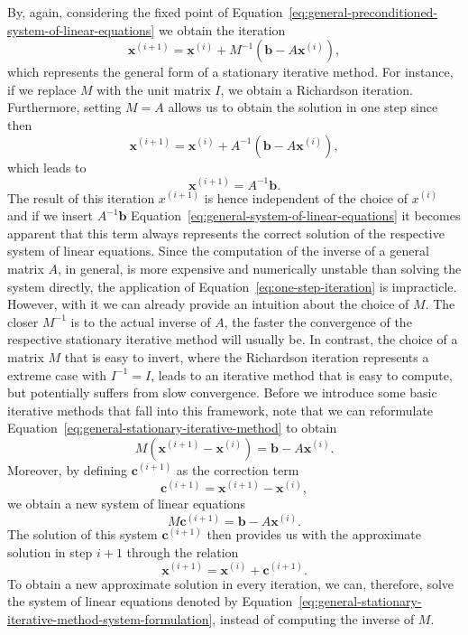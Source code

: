 By, again, considering the fixed point of Equation~\eqref{eq:general-preconditioned-system-of-linear-equations} we obtain the iteration
\begin{equation}
	\bm{x}^{(i+1)} = \bm{x}^{(i)} + M^{-1}(\bm b - A \bm{x}^{(i)}),
	\label{eq:general-stationary-iterative-method}
\end{equation}
which represents the general form of a stationary iterative method. 
For instance, if we replace $M$ with the unit matrix $I$, we obtain a Richardson iteration.
Furthermore, setting $M = A$ allows us to obtain the solution in one step since then
\begin{equation}
	\bm{x}^{(i+1)} = \bm{x}^{(i)} + A^{-1}(\bm b - A \bm{x}^{(i)}),
	\label{eq:one-step-iteration}
\end{equation}
which leads to
\begin{equation}
	\bm{x}^{(i+1)} = A^{-1}\bm b.
\end{equation}
The result of this iteration $x^{(i+1)}$ is hence independent of the choice of $x^{(i)}$ and if we insert $A^{-1}\bm b$ Equation~\eqref{eq:general-system-of-linear-equations} it becomes apparent that this term always represents the correct solution of the respective system of linear equations.
Since the computation of the inverse of a general matrix $A$, in general, is more expensive and numerically unstable than solving the system directly, the application of Equation~\eqref{eq:one-step-iteration} is impracticle.
However, with it we can already provide an intuition about the choice of $M$.
The closer $M^{-1}$ is to the actual inverse of $A$, the faster the convergence of the respective stationary iterative method will usually be.
In contrast, the choice of a matrix $M$ that is easy to invert, where the Richardson iteration represents a extreme case with $I^{-1} = I$, leads to an iterative method that is easy to compute, but potentially suffers from slow convergence.
Before we introduce some basic iterative methods that fall into this framework, note that we can reformulate Equation~\eqref{eq:general-stationary-iterative-method} to obtain
\begin{equation}
	M (\bm{x}^{(i+1)} - \bm{x}^{(i)}) = \bm{b} - A \bm{x}^{(i)}. 
\end{equation}
Moreover, by defining $\bm{c}^{(i+1)}$ as the correction term
\begin{equation}
	\bm{c}^{(i+1)} = \bm{x}^{(i+1)} - \bm{x}^{(i)},
\end{equation}
we obtain a new system of linear equations
\begin{equation}
	M \bm{c}^{(i+1)} = \bm{b} - A \bm{x}^{(i)}. 
	\label{eq:general-stationary-iterative-method-system-formulation}
\end{equation}
The solution of this system $\bm{c}^{(i+1)}$ then provides us with the approximate solution in step $i+1$ through the relation
\begin{equation}
	\bm{x}^{(i+1)} =  \bm{x}^{(i)} + \bm{c}^{(i+1)}.
\end{equation}
To obtain a new approximate solution in every iteration, we can, therefore, solve the system of linear equations denoted by Equation~\eqref{eq:general-stationary-iterative-method-system-formulation}, instead of computing the inverse of $M$.

